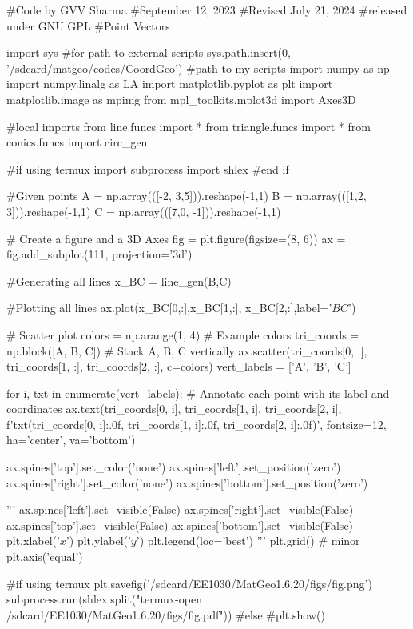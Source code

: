 #Code by GVV Sharma
#September 12, 2023
#Revised July 21, 2024
#released under GNU GPL
#Point Vectors


import sys                                          #for path to external scripts
sys.path.insert(0, '/sdcard/matgeo/codes/CoordGeo')        #path to my scripts
import numpy as np
import numpy.linalg as LA
import matplotlib.pyplot as plt
import matplotlib.image as mpimg
from mpl_toolkits.mplot3d import Axes3D

#local imports
from line.funcs import *
from triangle.funcs import *
from conics.funcs import circ_gen


#if using termux
import subprocess
import shlex
#end if

#Given points
A = np.array(([-2, 3,5])).reshape(-1,1) 
B = np.array(([1,2, 3])).reshape(-1,1)  
C = np.array(([7,0, -1])).reshape(-1,1)  



# Create a figure and a 3D Axes
fig = plt.figure(figsize=(8, 6))
ax = fig.add_subplot(111, projection='3d')

#Generating all lines
x_BC = line_gen(B,C)


#Plotting all lines
ax.plot(x_BC[0,:],x_BC[1,:], x_BC[2,:],label='$BC$')

# Scatter plot
colors = np.arange(1, 4)  # Example colors
tri_coords = np.block([A, B, C])  # Stack A, B, C vertically
ax.scatter(tri_coords[0, :], tri_coords[1, :], tri_coords[2, :], c=colors)
vert_labels = ['A', 'B', 'C']

for i, txt in enumerate(vert_labels):
    # Annotate each point with its label and coordinates
    ax.text(tri_coords[0, i], tri_coords[1, i], tri_coords[2, i], f'{txt}\n({tri_coords[0, i]:.0f}, {tri_coords[1, i]:.0f}, {tri_coords[2, i]:.0f})',
             fontsize=12, ha='center', va='bottom')

ax.spines['top'].set_color('none')
ax.spines['left'].set_position('zero')
ax.spines['right'].set_color('none')
ax.spines['bottom'].set_position('zero')

'''
ax.spines['left'].set_visible(False)
ax.spines['right'].set_visible(False)
ax.spines['top'].set_visible(False)
ax.spines['bottom'].set_visible(False)
plt.xlabel('$x$')
plt.ylabel('$y$')
plt.legend(loc='best')
'''
plt.grid() # minor
plt.axis('equal')

#if using termux
plt.savefig('/sdcard/EE1030/MatGeo1.6.20/figs/fig.png')
subprocess.run(shlex.split("termux-open /sdcard/EE1030/MatGeo1.6.20/figs/fig.pdf"))
#else
#plt.show()

